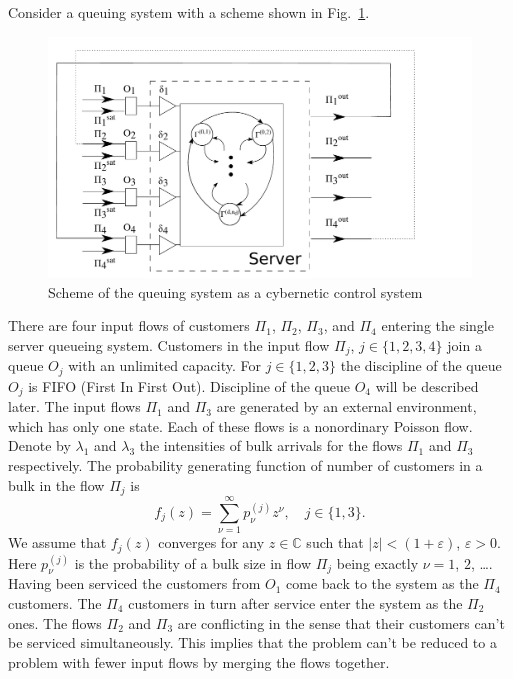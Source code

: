 \documentclass[runningheads,a4paper]{llncs}
\begin{document}
Consider a queuing system with a scheme shown in Fig.~\ref{SystemScheme}.  
\begin{figure}[h!]
   \centering
    \includegraphics[width=\textwidth]{SystemScheme.pdf} %
    \caption {Scheme of the queuing system as a cybernetic control system}
    \label{SystemScheme}
\end{figure}
There are four
input flows of customers $\Pi_1$, $\Pi_2$, $\Pi_3$, and $\Pi_4$ entering the single server queueing
system. Customers in the input flow $\Pi_j$, $j \in \{1,2,3,4\}$ join a queue $O_j$ with an
unlimited capacity. For $j \in \{1,2,3\}$ the discipline of the queue $O_j$ is FIFO (First In First
Out). Discipline of the queue $O_4$ will be described later. The input flows $\Pi_1$ and $\Pi_3$ are
generated by an external environment, which has only one state. Each of these flows is a nonordinary
Poisson flow. Denote by $\lambda_1$ and $\lambda_3$ the intensities of bulk arrivals for the flows
$\Pi_1$ and $\Pi_3$ respectively. The probability generating function of number of customers in a
bulk in the flow $\Pi_j$ is
\begin{equation}
f_j(z) = \sum_{\nu=1}^{\infty} p_{\nu}^{(j)} z ^{\nu}, \quad j\in \{1,3\}.
\label{GeneratingFunc}
\end{equation}
We assume that $f_j(z)$ converges for any $z\in \mathbb{C}$ such that $|z|<(1+\varepsilon)$,
$\varepsilon>0$. Here $p_{\nu}^{(j)}$ is the probability of a bulk size in flow $\Pi_j$ being
exactly $\nu=1$, $2$, \ldots. Having been serviced the customers from $O_1$ come back to the system
as the $\Pi_4$ customers. The $\Pi_4$ customers in turn after service enter the system as the
$\Pi_2$ ones. The flows $\Pi_2$ and $\Pi_3$ are conflicting in the sense that their customers can't
be serviced simultaneously. This implies that the problem can't be reduced to a problem with fewer
input flows by merging the flows together.
\end{document}
